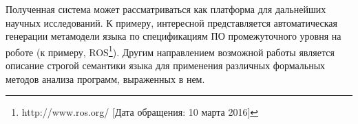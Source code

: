 \documentclass[conference]{IEEEtran}
\begin{document}
Полученная система может рассматриваться как платформа для дальнейших научных исследований. К примеру, интересной представляется автоматическая генерации метамодели языка по спецификациям ПО промежуточного уровня на роботе (к примеру, ROS\footnote{http://www.ros.org/ [Дата обращения: 10 марта 2016]}). Другим направлением возможной работы является описание строгой семантики языка для применения различных формальных методов анализа программ, выраженных в нем.

\newpage


\end{document}
